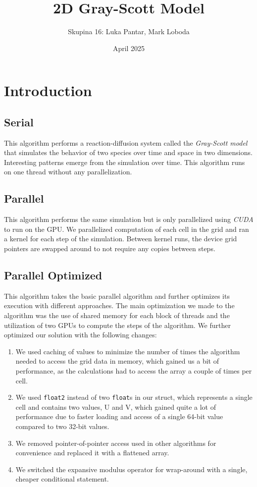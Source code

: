 \documentclass{article}
\title{2D Gray-Scott Model}
\author{Skupina 16: Luka Pantar, Mark Loboda}
\date{April 2025}
\begin{document}
\maketitle

\section{Introduction}
\subsection{Serial}
This algorithm performs a reaction-diffusion system called the \textit{Gray-Scott model} that simulates the behavior of two species over time and space in two dimensions. Interesting patterns emerge from the simulation over time. This algorithm runs on one thread without any parallelization.

\subsection{Parallel}
This algorithm performs the same simulation but is only parallelized using \textit{CUDA} to run on the GPU. We parallelized computation of each cell in the grid and ran a kernel for each step of the simulation. Between kernel runs, the device grid pointers are swapped around to not require any copies between steps. 

\subsection{Parallel Optimized}
\label{sub13:parallel_optimized}
This algorithm takes the basic parallel algorithm and further optimizes its execution with different approaches. The main optimization we made to the algorithm was the use of shared memory for each block of threads and the utilization of two GPUs to compute the steps of the algorithm. We further optimized our solution with the following changes:
\begin{enumerate}
    \item We used caching of values to minimize the number of times the algorithm needed to access the grid data in memory, which gained us a bit of performance, as the calculations had to access the array a couple of times per cell.
    \item We used \texttt{float2} instead of two \texttt{float}s in our struct, which represents a single cell and contains two values, U and V, which gained quite a lot of performance due to faster loading and access of a single 64-bit value compared to two 32-bit values.
    \item We removed pointer-of-pointer access used in other algorithms for convenience and replaced it with a flattened array.
    \item We switched the expansive modulus operator for wrap-around with a single, cheaper conditional statement. 
\end{enumerate}
\end{document}
